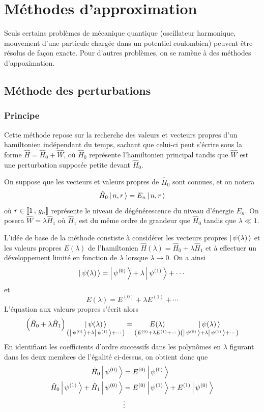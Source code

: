\section{Méthodes d’approximation}

    Seuls certains problèmes de mécanique quantique (oscillateur harmonique, mouvement d’une particule chargée dans un potentiel coulombien) peuvent être résolus de façon exacte. Pour d’autres problèmes, on se ramène à des méthodes d’appoximation.

    \subsection{Méthode des perturbations}

        \subsubsection{Principe}

    Cette méthode repose sur la recherche des valeurs et vecteurs propres d’un hamiltonien indépendant du temps, sachant que celui-ci peut s’écrire sous la forme $\hat{H} = \hat{H}_0 + \hat{W}$, où $\hat{H}_0$ représente l’hamiltonien principal tandis que $\hat{W}$ est une perturbation supposée petite devant $\hat{H}_0$. 

    On suppose que les vecteurs et valeurs propres de $\hat{H}_0$ sont connues, et on notera 
    \[ \hat{H}_0 \left| \, n,r \, \right> = E_n \left| \, n,r \, \right> \]   
    où $r \in \left[\!\left[ 1 \, , \, g_n \right]\!\right]$ représente le niveau de dégénérescence du niveau d’énergie $E_n$. On posera $\hat{W} = \lambda \hat{H}_1$ où $\hat{H}_1$ est du même ordre de grandeur que $\hat{H}_0$ tandis que $\lambda \ll 1$. 

    L’idée de base de la méthode constiste à considérer les vecteurs propres $\left| \, \psi(\lambda) \, \right>$ et les valeurs propres $E(\lambda)$ de l’hamiltonien $\hat{H}(\lambda) = \hat{H}_0 + \lambda \hat{H}_1$ et à effectuer un développement limité en fonction de $\lambda$ lorsque $\lambda \to 0$. On a ainsi 
    \[ \left| \, \psi(\lambda) \, \right> = \left| \, \psi^{(0)} \, \right> + \lambda \left| \, \psi^{(1)} \, \right> + \cdots \] 
    et 
    \[ E(\lambda) = E^{(0)} + \lambda E^{(1)} + \cdots \]   
    L’équation aux valeurs propres s’écrit alors 
    \begin{align*}
        \left(\hat{H}_0 + \lambda \hat{H}_1\right) \underset{\left(\left| \, \psi^{(0)} \, \right> + \lambda \left| \, \psi^{(1)} \, \right> + \cdots\right)}{\left| \, \psi(\lambda) \, \right>} &= \underset{\left(E^{(0)} + \lambda E^{(1)} + \cdots\right)}{E(\lambda)} \underset{\left(\left| \, \psi^{(0)} \, \right> + \lambda \left| \, \psi^{(1)} \, \right> + \cdots\right)}{\left| \, \psi(\lambda) \, \right>} \\
    \end{align*}
    En identifiant les coefficients d’ordre successifs dans les polynômes en $\lambda$ figurant dans les deux membres de l’égalité ci-dessus, on obtient donc que 
    \begin{align*}
        \hat{H}_0 \left| \, \psi^{(0)} \, \right> &= E^{(0)} \left| \, \psi^{(0)} \, \right> \\
        \hat{H}_0 \left| \, \psi^{(1)} \, \right> + \hat{H}_1 \left| \, \psi^{(0)} \, \right> &= E^{(0)} \left| \, \psi^{(1)} \, \right> + E^{(1)} \left| \, \psi^{(0)} \, \right> \\  
        &\vdots
    \end{align*}
    

